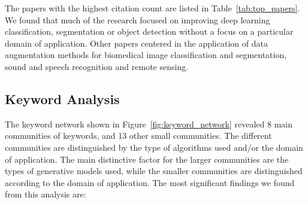 \documentclass[parskip=full]{scrartcl}
\begin{document}
The papers with the highest citation count are listed in
Table~\ref{tab:top_papers}. 
We found that much of the research focused on improving deep learning
classification, segmentation or object detection without a focus on a
particular domain of application. Other papers centered in the application of
data augmentation methods for biomedical image classification and
segmentation, sound and speech recognition and remote sensing. 

\begin{table}[H]
    \centering
    \vspace{.2cm}
    \caption{\label{tab:top_papers}
        Top papers using data augmentation techniques, sorted by citation
        count.
    }
\end{table}


\subsection{Keyword Analysis}

The keyword network shown in Figure~\ref{fig:keyword_network} revealed 8 main
communities of keywords, and 13 other small communities. The different
communities are distinguished by the type of algorithms used and/or the domain
of application. The main distinctive factor for the larger communities are the
types of generative models used, while the smaller communities are
distinguished according to the domain of application. The most significant
findings we found from this analysis are:
\end{document}

